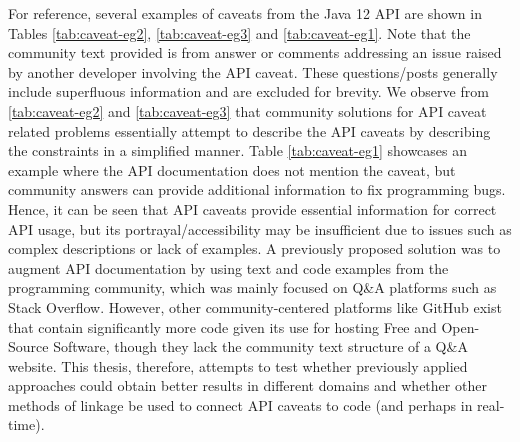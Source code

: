 For reference, several examples of caveats from the Java 12 API are shown in Tables \ref{tab:caveat-eg2}, \ref{tab:caveat-eg3} and \ref{tab:caveat-eg1}. Note that the community text provided is from answer or comments addressing an issue raised by another developer involving the API caveat. These questions/posts generally include superfluous information and are excluded for brevity. We observe from \ref{tab:caveat-eg2} and \ref{tab:caveat-eg3} that community solutions for API caveat related problems essentially attempt to describe the API caveats by describing the constraints in a simplified manner. Table \ref{tab:caveat-eg1} showcases an example where the API documentation does not mention the caveat, but community answers can provide additional information to fix programming bugs. Hence, it can be seen that API caveats provide essential information for correct API usage, but its portrayal/accessibility may be insufficient due to issues such as complex descriptions or lack of examples. A previously proposed solution was to augment API documentation by using text and code examples from the programming community, which was mainly focused on Q\&A platforms such as Stack Overflow.  However, other community-centered platforms like GitHub exist that contain significantly more code given its use for hosting Free and Open-Source Software, though they lack the community text structure of a Q\&A website. This thesis, therefore, attempts to test whether previously applied approaches could obtain better results in different domains and whether other methods of linkage be used to connect API caveats to code (and perhaps in real-time).

